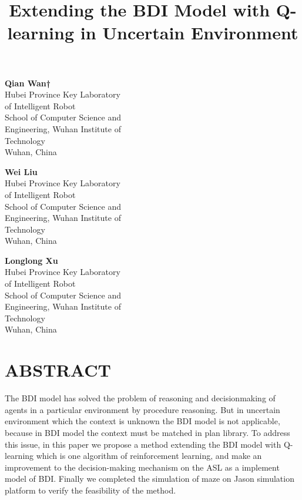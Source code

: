 \documentclass{article}
\title{\textbf{Extending the BDI Model with Q-learning in Uncertain
Environment}}
\date{}
\begin{document}
\maketitle

\section*{}

\begin{multicols}{3}
  \textbf{Qian Wan†} \\
  Hubei Province Key Laboratory \\
  of Intelligent Robot\\
  School of Computer Science and\\
  Engineering, Wuhan Institute of\\
  Technology \\
  Wuhan, China
 \\
  \columnbreak

  \textbf{Wei Liu} \\
  Hubei Province Key Laboratory\\
  of Intelligent Robot\\
  School of Computer Science and\\
  Engineering, Wuhan Institute of\\
  Technology\\
  Wuhan, China\\

  \columnbreak

  \textbf{Longlong Xu} \\
  Hubei Province Key Laboratory\\
  of Intelligent Robot\\
  School of Computer Science and\\
  Engineering, Wuhan Institute of\\
  Technology\\
  Wuhan, China\\
\end{multicols}

\section*{ABSTRACT}
The BDI model has solved the problem of reasoning and decisionmaking of agents in a particular environment by procedure
reasoning. But in uncertain environment which the context is
unknown the BDI model is not applicable, because in BDI model
the context must be matched in plan library. To address this issue,
in this paper we propose a method extending the BDI model with
Q-learning which is one algorithm of reinforcement learning, and
make an improvement to the decision-making mechanism on the
ASL as a implement model of BDI. Finally we completed the
simulation of maze on Jason simulation platform to verify the
feasibility of the method.
\end{document}
